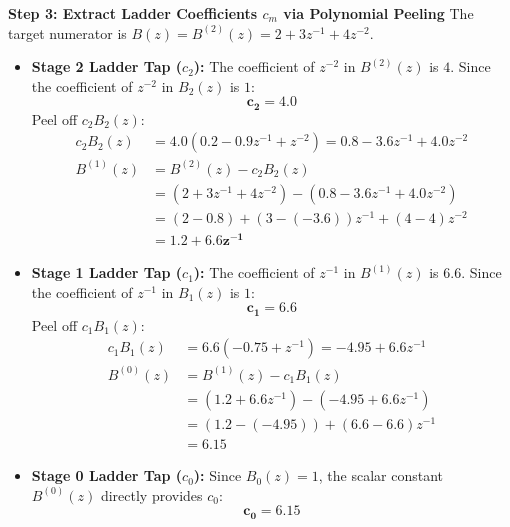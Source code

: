 \documentclass[11pt,a4paper]{article}
\begin{document}
\vspace{1mm}
\noindent\textbf{Step 3: Extract Ladder Coefficients $c_m$ via Polynomial Peeling}
The target numerator is $B(z) = B^{(2)}(z) = 2 + 3 z^{-1} + 4 z^{-2}$.
\begin{itemize}
    \item \textbf{Stage 2 Ladder Tap ($c_2$):}
    The coefficient of $z^{-2}$ in $B^{(2)}(z)$ is $4$. Since the coefficient of $z^{-2}$ in $B_2(z)$ is $1$:
    \begin{equation}
    \mathbf{c_2 = 4.0}
    \end{equation}
    Peel off $c_2 B_2(z)$:
    \begin{align}
    c_2 B_2(z) &= 4.0(0.2 - 0.9 z^{-1} + z^{-2}) = 0.8 - 3.6 z^{-1} + 4.0 z^{-2} \\
    B^{(1)}(z) &= B^{(2)}(z) - c_2 B_2(z) \nonumber \\
    &= (2 + 3 z^{-1} + 4 z^{-2}) - (0.8 - 3.6 z^{-1} + 4.0 z^{-2}) \nonumber \\
    &= (2 - 0.8) + (3 - (-3.6)) z^{-1} + (4 - 4) z^{-2} \nonumber \\
    &= \mathbf{1.2 + 6.6 z^{-1}}
    \end{align}
    
    \item \textbf{Stage 1 Ladder Tap ($c_1$):}
    The coefficient of $z^{-1}$ in $B^{(1)}(z)$ is $6.6$. Since the coefficient of $z^{-1}$ in $B_1(z)$ is $1$:
    \begin{equation}
    \mathbf{c_1 = 6.6}
    \end{equation}
    Peel off $c_1 B_1(z)$:
    \begin{align}
    c_1 B_1(z) &= 6.6(-0.75 + z^{-1}) = -4.95 + 6.6 z^{-1} \\
    B^{(0)}(z) &= B^{(1)}(z) - c_1 B_1(z) \nonumber \\
    &= (1.2 + 6.6 z^{-1}) - (-4.95 + 6.6 z^{-1}) \nonumber \\
    &= (1.2 - (-4.95)) + (6.6 - 6.6) z^{-1} \nonumber \\
    &= \mathbf{6.15}
    \end{align}
    
    \item \textbf{Stage 0 Ladder Tap ($c_0$):}
    Since $B_0(z) = 1$, the scalar constant $B^{(0)}(z)$ directly provides $c_0$:
    \begin{equation}
    \mathbf{c_0 = 6.15}
    \end{equation}
\end{itemize}
\end{document}
